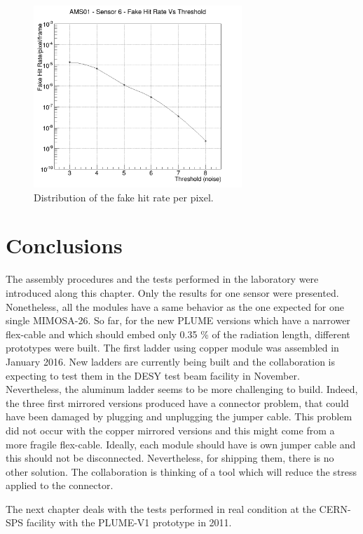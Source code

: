  \begin{figure}
    \centering
    \includegraphics[width=0.7\textwidth]{Pictures/labTests/fake_sensor6.png}
    \caption{Distribution of the fake hit rate per pixel.}
    \label{fig:FHR}
  \end{figure}

\section{Conclusions}

  The assembly procedures and the tests performed in the laboratory were introduced along this chapter.
  Only the results for one sensor were presented.
  Nonetheless, all the modules have a same behavior as the one expected for one single MIMOSA-26.
  So far, for the new PLUME versions which have a narrower flex-cable and which should embed only 0.35 \% of the radiation length, different prototypes were built. 
  The first ladder using copper module was assembled in January 2016.
  New ladders are currently being built and the collaboration is expecting to test them in the DESY test beam facility in November.
  Nevertheless, the aluminum ladder seems to be more challenging to build.
  Indeed, the three first mirrored versions produced have a connector problem, that could have been damaged by plugging and unplugging the jumper cable.
  This problem did not occur with the copper mirrored versions and this might come from a more fragile flex-cable.
  Ideally, each module should have is own jumper cable and this should not be disconnected.
  Nevertheless, for shipping them, there is no other solution.
  The collaboration is thinking of a tool which will reduce the stress applied to the connector.

  The next chapter deals with the tests performed in real condition at the CERN-SPS facility with the PLUME-V1 prototype in 2011.


